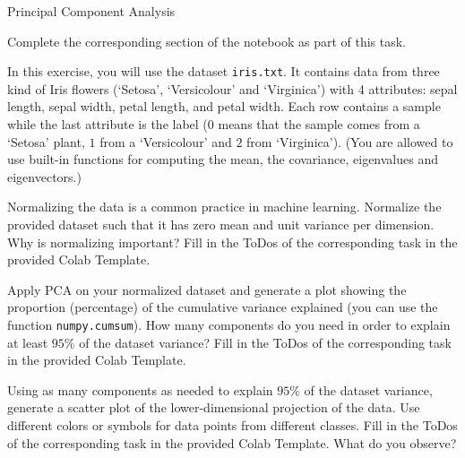 \documentclass[
	english,
        solution=true
	]{tudaexercise}
\begin{document}
\begin{task}[points=28]{Principal Component Analysis}
\begin{programmingtaskbox}
Complete the corresponding section of the notebook as part of this task.
\end{programmingtaskbox}
In this exercise, you will use the dataset \texttt{iris.txt}. It contains data from three kind of Iris flowers (`Setosa', `Versicolour' and `Virginica') with 4 attributes: sepal length, sepal width, petal length, and petal width. Each row contains a sample while the last attribute is the label ($0$ means that the sample comes from a `Setosa' plant, $1$ from a `Versicolour' and $2$ from `Virginica').
(You are allowed to use built-in functions for computing the mean, the covariance, eigenvalues and eigenvectors.)



\begin{subtask}[points=3, title=Data Normalization]
Normalizing the data is a common practice in machine learning. Normalize the provided dataset such that it has zero mean and unit variance per dimension. Why is normalizing important?
Fill in the ToDos of the corresponding task in the provided Colab Template.

\begin{solution}

\end{solution}

\end{subtask}



\begin{subtask}[points=8, title=Principal Component Analysis]
Apply PCA on your normalized dataset and generate a plot showing the proportion (percentage) of the cumulative variance explained (you can use the function \texttt{numpy.cumsum}). 
How many components do you need in order to explain at least $95\%$ of the dataset variance? 
Fill in the ToDos of the corresponding task in the provided Colab Template.
\begin{solution}

\end{solution}
\end{subtask}



\begin{subtask}[points=6, title=Low Dimensional Space]
Using as many components as needed to explain $95\%$ of the dataset variance, generate a scatter plot of the lower-dimensional projection of the data. Use different colors or symbols for data points from different classes. Fill in the ToDos of the corresponding task in the provided Colab Template. What do you observe? 



\end{subtask}
\end{task}
\end{document}
